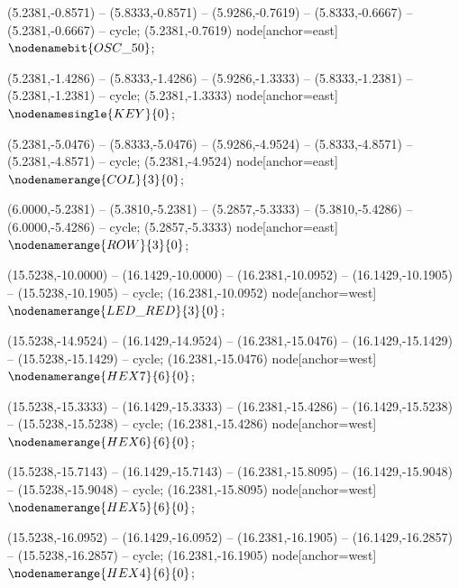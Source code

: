    (5.2381,-0.8571) -- (5.8333,-0.8571) -- (5.9286,-0.7619) -- (5.8333,-0.6667) -- (5.2381,-0.6667) -- cycle;
   (5.2381,-0.7619) node[anchor=east] {$\nodenamebit{OSC\_50}$};

   (5.2381,-1.4286) -- (5.8333,-1.4286) -- (5.9286,-1.3333) -- (5.8333,-1.2381) -- (5.2381,-1.2381) -- cycle;
   (5.2381,-1.3333) node[anchor=east] {$\nodenamesingle{KEY}{0}$};

   (5.2381,-5.0476) -- (5.8333,-5.0476) -- (5.9286,-4.9524) -- (5.8333,-4.8571) -- (5.2381,-4.8571) -- cycle;
   (5.2381,-4.9524) node[anchor=east] {$\nodenamerange{COL}{3}{0}$};

   (6.0000,-5.2381) -- (5.3810,-5.2381) -- (5.2857,-5.3333) -- (5.3810,-5.4286) -- (6.0000,-5.4286) -- cycle;
   (5.2857,-5.3333) node[anchor=east] {$\nodenamerange{ROW}{3}{0}$};

   (15.5238,-10.0000) -- (16.1429,-10.0000) -- (16.2381,-10.0952) -- (16.1429,-10.1905) -- (15.5238,-10.1905) -- cycle;
   (16.2381,-10.0952) node[anchor=west] {$\nodenamerange{LED\_RED}{3}{0}$};

   (15.5238,-14.9524) -- (16.1429,-14.9524) -- (16.2381,-15.0476) -- (16.1429,-15.1429) -- (15.5238,-15.1429) -- cycle;
   (16.2381,-15.0476) node[anchor=west] {$\nodenamerange{HEX7}{6}{0}$};

   (15.5238,-15.3333) -- (16.1429,-15.3333) -- (16.2381,-15.4286) -- (16.1429,-15.5238) -- (15.5238,-15.5238) -- cycle;
   (16.2381,-15.4286) node[anchor=west] {$\nodenamerange{HEX6}{6}{0}$};

   (15.5238,-15.7143) -- (16.1429,-15.7143) -- (16.2381,-15.8095) -- (16.1429,-15.9048) -- (15.5238,-15.9048) -- cycle;
   (16.2381,-15.8095) node[anchor=west] {$\nodenamerange{HEX5}{6}{0}$};

   (15.5238,-16.0952) -- (16.1429,-16.0952) -- (16.2381,-16.1905) -- (16.1429,-16.2857) -- (15.5238,-16.2857) -- cycle;
   (16.2381,-16.1905) node[anchor=west] {$\nodenamerange{HEX4}{6}{0}$};


